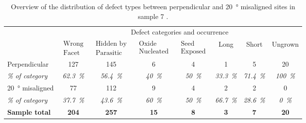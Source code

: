 \begin{table}
    \centering
    \caption[Overview of the distribution of defect types in sample 7.]{Overview of the distribution of defect types between perpendicular and \qty{20}{\degree} misaligned sites in sample 7 \cite{Brugnolotto2023_2}.}
    \begin{tabular}{l|ccccccc}
        \hline
         & \multicolumn{7}{c}{Defect categories and occurrence} \\ 
         & $\begin{matrix} \text{Wrong} \\ \text{Facet} \end{matrix}$ & $\begin{matrix} \text{Hidden by} \\ \text{Parasitic} \end{matrix}$ & $\begin{matrix} \text{Oxide} \\ \text{Nucleated} \end{matrix}$ & $\begin{matrix} \text{Seed} \\ \text{Exposed} \end{matrix}$ & Long & Short & Ungrown \\ 
        \hline \hline
        Perpendicular & \num{127} & \num{145} & \num{6} & \num{4} & \num{1} & \num{5} & \num{20} \\ 
        \textit{\% of category} & \textit{\qty{62.3}{\%}} & \textit{\qty{56.4}{\%}} & \textit{\qty{40}{\%}} & \textit{\qty{50}{\%}} & \textit{\qty{33.3}{\%}} & \textit{\qty{71.4}{\%}} & \textit{\qty{100}{\%}} \\ 
        \hline
        \qty{20}{\degree} misaligned & \num{77} & \num{112} & \num{9} & \num{4} & \num{2} & \num{2} & \num{0} \\ 
        \textit{\% of category} & \textit{\qty{37.7}{\%}} & \textit{\qty{43.6}{\%}} & \textit{\qty{60}{\%}} & \textit{\qty{50}{\%}} & \textit{\qty{66.7}{\%}} & \textit{\qty{28.6}{\%}} & \textit{\qty{0}{\%}} \\ 
        \hline
        \textbf{Sample total} & \textbf{\num{204}} & \textbf{\num{257}} & \textbf{\num{15}} & \textbf{\num{8}} & \textbf{\num{3}} & \textbf{\num{7}} & \textbf{\num{20}} \\
        \hline
    \end{tabular}
    \label{tab:defects_s7}
\end{table}

